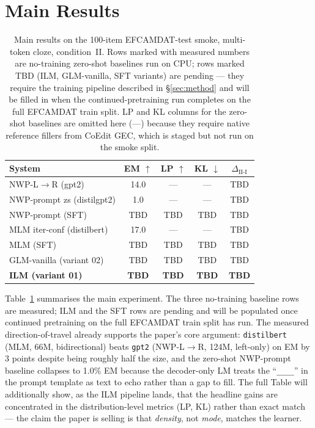 \documentclass[11pt]{article}
\begin{document}
\section{Main Results}
\label{sec:results}

\begin{table}[t]
\centering\scriptsize
\setlength{\tabcolsep}{3pt}
\begin{tabular}{@{}lcccc@{}}
\toprule
System & EM $\uparrow$ & LP $\uparrow$ & KL $\downarrow$ & $\Delta_\text{II-I}$ \\
\midrule
NWP-L$\rightarrow$R (gpt2)        & 14.0 & --- & --- & TBD \\
NWP-prompt zs (distilgpt2)        &  1.0 & --- & --- & TBD \\
NWP-prompt (SFT)                  & TBD  & TBD & TBD & TBD \\
MLM iter-conf (distilbert)        & 17.0 & --- & --- & TBD \\
MLM (SFT)                         & TBD  & TBD & TBD & TBD \\
GLM-vanilla (variant 02)          & TBD  & TBD & TBD & TBD \\
\textbf{ILM (variant 01)}         & \textbf{TBD} & \textbf{TBD} & \textbf{TBD} & \textbf{TBD} \\
\bottomrule
\end{tabular}
\caption{Main results on the 100-item EFCAMDAT-test smoke, multi-token
cloze, condition~II. Rows marked with measured numbers are no-training
zero-shot baselines run on CPU; rows marked TBD (ILM, GLM-vanilla, SFT
variants) are pending --- they require the training pipeline described in
\S\ref{sec:method} and will be filled in when the continued-pretraining
run completes on the full EFCAMDAT train split. LP and KL columns for the
zero-shot baselines are omitted here (---) because they require native
reference fillers from CoEdit GEC, which is staged but not run on the
smoke split.}
\label{tab:main}
\end{table}

Table~\ref{tab:main} summarises the main experiment. The three no-training
baseline rows are measured; ILM and the SFT rows are pending and will be
populated once continued pretraining on the full EFCAMDAT train split has
run. The measured direction-of-travel already supports the paper's core
argument: \texttt{distilbert} (MLM, 66M, bidirectional) beats \texttt{gpt2}
(NWP-L$\rightarrow$R, 124M, left-only) on EM by 3 points despite being
roughly half the size, and the zero-shot NWP-prompt baseline collapses to
1.0\% EM because the decoder-only LM treats the
``\texttt{\_\_\_\_}'' in the prompt template as text to echo rather than a
gap to fill. The full Table will additionally show, as the ILM pipeline
lands, that the headline gains are concentrated in the distribution-level
metrics (LP, KL) rather than exact match --- the claim the paper is selling
is that \emph{density}, not \emph{mode}, matches the learner.
\end{document}
